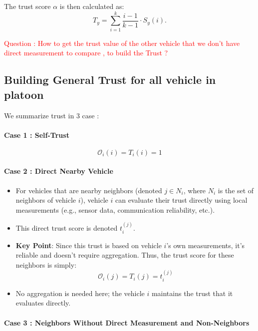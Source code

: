 \documentclass[letterpaper, 10pt, conference]{ieeeconf}  %
\begin{document}
The trust score $\alpha$ is then calculated as:
\begin{equation}
    T_y = \sum_{i=1}^k \frac{i-1}{k-1} \cdot S_y(i).
\end{equation}

\textcolor{red}{Question : How to get the trust value of the other vehicle that we don't have direct measurement to compare , to build the Trust ?} 
\subsection{Building General Trust  for all vehicle in platoon}

We summarize trust in 3 case : 
\paragraph{Case 1 : Self-Trust }
\begin{equation}
    \mathcal{O}_i(i) = T_i(i) = 1
\end{equation}

\paragraph{Case 2 : Direct Nearby Vehicle}
\begin{itemize}
    \item For vehicles that are nearby neighbors (denoted $j \in N_i$, where $N_i$ is the set of neighbors of vehicle $i$), vehicle $i$ can evaluate their trust directly using local measurements (e.g., sensor data, communication reliability, etc.).
    \item This direct trust score is denoted $t_i^{(j)}$.
    \item \textbf{Key Point}: Since this trust is based on vehicle $i$'s own measurements, it's reliable and doesn't require aggregation. Thus, the trust score for these neighbors is simply:
    \begin{equation}
        \mathcal{O}_i(j) = T_i(j) = t_i^{(j)}
    \end{equation}
    \item No aggregation is needed here; the vehicle $i$ maintains the trust that it evaluates directly.
\end{itemize}


\paragraph{Case 3 : Neighbors Without Direct Measurement and Non-Neighbors}
\end{document}
